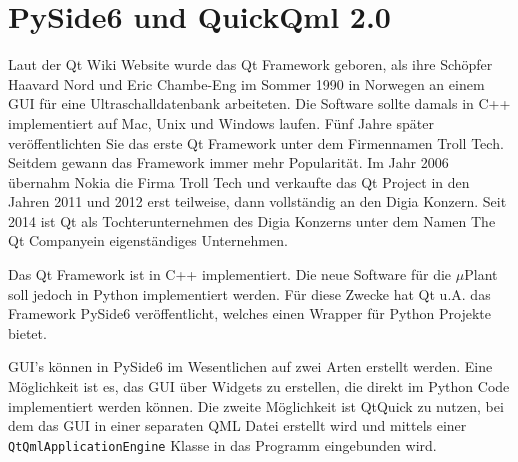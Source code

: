 \newpage
\section{PySide6 und QuickQml 2.0}

Laut der Qt Wiki Website \cite{QtWikiHistory} wurde das Qt Framework geboren, als ihre Schöpfer Haavard Nord und
Eric Chambe-Eng im Sommer 1990 in Norwegen an einem GUI für eine Ultraschalldatenbank arbeiteten.
Die Software sollte damals in C++ implementiert auf Mac, Unix und Windows laufen.
Fünf Jahre später veröffentlichten Sie das erste Qt Framework unter dem Firmennamen Troll Tech.
Seitdem gewann das Framework immer mehr Popularität.
Im Jahr 2006 übernahm Nokia die Firma Troll Tech und verkaufte das Qt Project in den Jahren 2011 und 2012 erst teilweise,
dann vollständig an den Digia Konzern.
Seit 2014 ist Qt als Tochterunternehmen des Digia Konzerns unter dem Namen \glqq The Qt Company\grqq ein eigenständiges Unternehmen.

Das Qt Framework ist in C++ implementiert.
Die neue Software für die $\mu$Plant soll jedoch in Python implementiert werden.
Für diese Zwecke hat Qt u.A. das Framework PySide6 veröffentlicht, welches einen Wrapper für Python Projekte bietet.

GUI's können in PySide6 im Wesentlichen auf zwei Arten erstellt werden.
Eine Möglichkeit ist es, das GUI über Widgets\cite{pysideQtWidgets} zu erstellen, die direkt im Python Code implementiert werden können.
Die zweite Möglichkeit ist QtQuick \cite{pysideQtQuick} zu nutzen, bei dem das GUI in einer separaten QML Datei erstellt wird und
mittels einer \verb|QtQmlApplicationEngine| Klasse in das Programm eingebunden wird.

